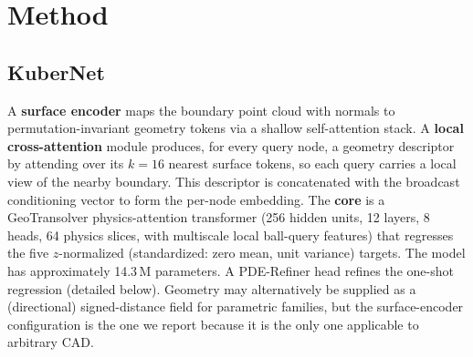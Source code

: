 \documentclass[conference]{IEEEtran}
\begin{document}
\section{Method}\label{sec:method}
\subsection{KuberNet}\label{sec:kubernet}
A \textbf{surface encoder} maps the boundary point cloud with normals to permutation-invariant
geometry tokens via a shallow self-attention stack. A \textbf{local cross-attention} module produces,
for every query node, a geometry descriptor by attending over its $k{=}16$ nearest surface tokens, so
each query carries a local view of the nearby boundary. This descriptor is concatenated with the
broadcast conditioning vector to form the per-node embedding. The \textbf{core} is a GeoTransolver
physics-attention transformer (256 hidden units, 12 layers, 8 heads, 64 physics slices, with
multiscale local ball-query features) that regresses the five $z$-normalized (standardized: zero mean, unit variance) targets. The model has
approximately 14.3\,M parameters. A PDE-Refiner head refines the one-shot
regression (detailed below). Geometry may alternatively be supplied as a
(directional) signed-distance field for parametric families, but the surface-encoder configuration is
the one we report because it is the only one applicable to arbitrary CAD.
\end{document}
